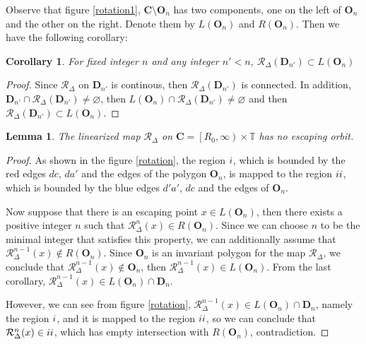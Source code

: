 \documentclass{article}
\def \Rone{\uppercase\expandafter{\romannumeral1}}
\def \Rtwo{\uppercase\expandafter{\romannumeral2}}
\numberwithin{figure}{section}
\numberwithin{equation}{section}
\newtheorem{lemma}{Lemma}
\newtheorem*{corollary}{Corollary}
\theoremstyle{remark}
\theoremstyle{definition}
\begin{document}
 Observe that figure \ref{rotation1}, $\textbf{C}\setminus\textbf{O}_{n}$ has two components, one on the left of $\textbf{O}_n$ and the other on the right. Denote them by $L\left(\textbf{O}_n\right)$ and $R\left(\textbf{O}_n\right)$. Then we have the following corollary:
	\begin{corollary}\label{connected argument}
	For fixed integer $n$ and any integer $n'<n$, $\mathcal{R}_\Delta\left(\textbf{D}_{n'}\right) \subset L\left(\textbf{O}_n\right)$
    \end{corollary}	
    \begin{proof}
    	Since $\mathcal{R}_\Delta$ on $\textbf{D}_{n'}$ is continous, then $\mathcal{R}_\Delta\left(\textbf{D}_{n'}\right)$ is connected. In addition, $\textbf{D}_{n'} \cap \mathcal{R}_\Delta\left(\textbf{D}_{n'}\right)\ne \varnothing$, then $L\left(\textbf{O}_n\right) \cap \mathcal{R}_\Delta\left(\textbf{D}_{n'}\right)\ne \varnothing$ and then $\mathcal{R}_\Delta\left(\textbf{D}_{n'}\right) \subset L\left(\textbf{O}_n\right)$.
   	\end{proof}
%	
%
	\begin{lemma}\label{linear nonescape}
		The linearized map $\mathcal{R}_\Delta$ on $\textbf{C}= \left[R_0, \infty\right) \times \mathbb{T}$ has no escaping orbit.
	\end{lemma}	
\begin{proof}
 As shown in the figure \ref{rotation}, the region $\Rone$, which is bounded by the red edges $dc$, $da'$ and the edges of the polygon $\textbf{O}_n$, is mapped to the region $\Rtwo$, which is bounded by the blue edges $d'a'$, $dc$ and the edges of $\textbf{O}_n$.
	
	Now suppose that there is an escaping point $x\in L\left(\textbf{O}_n\right)$, then there exists a positive integer $n$ such that $\mathcal{R}_\Delta^n(x)\in R\left(\textbf{O}_n\right)$. Since we can choose $n$ to be the minimal integer that satisfies this property, we can additionally assume that $\mathcal{R}_\Delta^{n-1}(x)\notin R\left(\textbf{O}_n\right)$. Since $\textbf{O}_n$ is an invariant polygon for the map $\mathcal{R}_\Delta$, we conclude that $\mathcal{R}_\Delta^{n-1}(x)\notin \textbf{O}_n$, then $\mathcal{R}_\Delta^{n-1}(x)\in L\left(\textbf{O}_n\right)$. From the last corollary, $\mathcal{R}_\Delta^{n-1}(x)\in L\left(\textbf{O}_n\right)\cap \textbf{D}_n$. 
	
  However, we can see from figure \ref{rotation}, $\mathcal{R}_\Delta^{n-1}(x)\in L\left(\textbf{O}_n\right)\cap \textbf{D}_n$, namely the region $\Rone$, and it is mapped to the region $\Rtwo$, so we can conclude that $\mathcal{R}_\Delta^{n}(x)\in\Rtwo$, which has empty intersection with $R\left(\textbf{O}_n\right)$, contradiction.
	
\end{proof}
\end{document}

